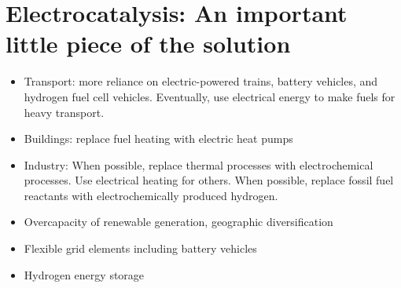 
\section{Electrocatalysis: An important little piece of the solution}\label{sec:our_part}



\begin{itemize}
	\item Transport: more reliance on electric-powered trains, battery vehicles, and hydrogen fuel cell vehicles. Eventually, use electrical energy to make fuels for heavy transport.
	
	\item Buildings: replace fuel heating with electric heat pumps
	
	\item Industry: When possible, replace thermal processes with electrochemical processes. Use electrical heating for others. When possible, replace fossil fuel reactants with electrochemically produced hydrogen.
\end{itemize}

\begin{itemize}
	\item Overcapacity of renewable generation, geographic diversification
	
	\item Flexible grid elements including battery vehicles
	
	\item Hydrogen energy storage
\end{itemize}